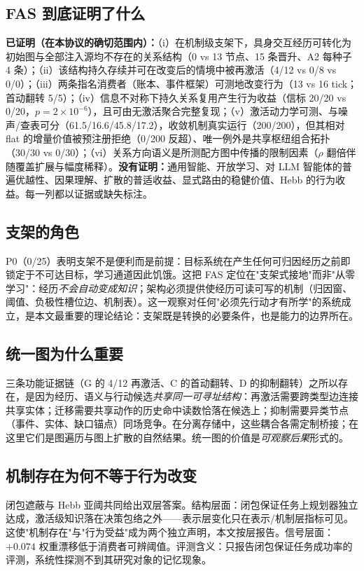 \documentclass[10pt,a4paper]{ctexart}
\begin{document}
\subsection{FAS 到底证明了什么}
\textbf{已证明（在本协议的确切范围内）：}（i）在机制级支架下，具身交互经历可转化为初始图与全部注入源均不存在的关系结构（0 vs 13 节点、15 条晋升、A2 每种子 4 条）；（ii）该结构持久存续并可在改变后的情境中被再激活（4/12 vs 0/8 vs 0/0）；（iii）两条指名消费者（账本、事件框架）可测地改变行为（13 vs 16 tick；首动翻转 5/5）；（iv）信息不对称下持久关系复用产生行为收益（信标 20/20 vs 0/20，$p{=}2\times10^{-6}$），且可由无激活聚合完整复现；（v）激活动力学可测、与噪声/查表可分（61.5/16.6/45.8/17.2），收敛机制真实运行（200/200），但其相对 flat 的增量价值被预注册拒绝（0/200 反超）、唯一例外是共享枢纽组合拓扑（30/30 vs 0/30）；（vi）关系方向语义是所测配方图中传播的限制因素（$\rho$ 翻倍伴随覆盖扩展与幅度稀释）。\textbf{没有证明：}通用智能、开放学习、对 LLM 智能体的普遍优越性、因果理解、扩散的普适收益、显式路由的稳健价值、Hebb 的行为收益。每一列都以证据或缺失标注。

\subsection{支架的角色}
P0（0/25）表明支架不是便利而是前提：目标系统在产生任何可归因经历之前即锁定于不可达目标，学习通道因此饥饿。这把 FAS 定位在"支架式接地"而非"从零学习"：经历\emph{不会自动变成知识}；架构必须提供使经历可读可写的机制（归因窗、阈值、负极性槽位边、机制表）。这一观察对任何"必须先行动才有所学"的系统成立，是本文最重要的理论结论：支架既是转换的必要条件，也是能力的边界所在。

\subsection{统一图为什么重要}
三条功能证据链（G 的 4/12 再激活、C 的首动翻转、D 的抑制翻转）之所以存在，是因为经历、语义与行动候选\emph{共享同一可寻址结构}：再激活需要跨类型边连接共享实体；迁移需要共享动作的历史命中读数恰落在候选上；抑制需要异类节点（事件、实体、缺口锚点）同场竞争。在分离存储中，这些耦合各需定制桥接；在这里它们是图遍历与图上扩散的自然结果。统一图的价值是\emph{可观察后果}形式的。

\subsection{机制存在为何不等于行为改变}
闭包遮蔽与 Hebb 亚阈共同给出双层答案。结构层面：闭包保证任务上规划器独立达成，激活级知识落在决策包络之外——表示层变化只在表示/机制层指标可见。这使"机制存在"与"行为受益"成为两个独立声明，本文按层报告。信号层面：$+0.074$ 权重漂移低于消费者可辨阈值。评测含义：只报告闭包保证任务成功率的评测，系统性探测不到其研究对象的记忆现象。
\end{document}

